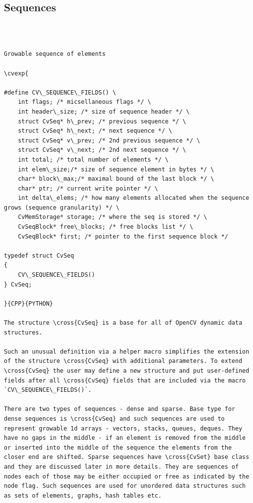 \subsection{Sequences}
\begin{verbatim}


\end{verbatim}
\label{CvSeq}
\begin{verbatim}

Growable sequence of elements

\cvexp{

#define CV\_SEQUENCE\_FIELDS() \
    int flags; /* micsellaneous flags */ \
    int header\_size; /* size of sequence header */ \
    struct CvSeq* h\_prev; /* previous sequence */ \
    struct CvSeq* h\_next; /* next sequence */ \
    struct CvSeq* v\_prev; /* 2nd previous sequence */ \
    struct CvSeq* v\_next; /* 2nd next sequence */ \
    int total; /* total number of elements */ \
    int elem\_size;/* size of sequence element in bytes */ \
    char* block\_max;/* maximal bound of the last block */ \
    char* ptr; /* current write pointer */ \
    int delta\_elems; /* how many elements allocated when the sequence grows (sequence granularity) */ \
    CvMemStorage* storage; /* where the seq is stored */ \
    CvSeqBlock* free\_blocks; /* free blocks list */ \
    CvSeqBlock* first; /* pointer to the first sequence block */

typedef struct CvSeq
{
    CV\_SEQUENCE\_FIELDS()
} CvSeq;

}{CPP}{PYTHON}

The structure \cross{CvSeq} is a base for all of OpenCV dynamic data structures.

Such an unusual definition via a helper macro simplifies the extension of the structure \cross{CvSeq} with additional parameters. To extend \cross{CvSeq} the user may define a new structure and put user-defined fields after all \cross{CvSeq} fields that are included via the macro `CV\_SEQUENCE\_FIELDS()`.

There are two types of sequences - dense and sparse. Base type for dense sequences is \cross{CvSeq} and such sequences are used to represent growable 1d arrays - vectors, stacks, queues, deques. They have no gaps in the middle - if an element is removed from the middle or inserted into the middle of the sequence the elements from the closer end are shifted. Sparse sequences have \cross{CvSet} base class and they are discussed later in more details. They are sequences of nodes each of those may be either occupied or free as indicated by the node flag. Such sequences are used for unordered data structures such as sets of elements, graphs, hash tables etc.


\end{verbatim}
